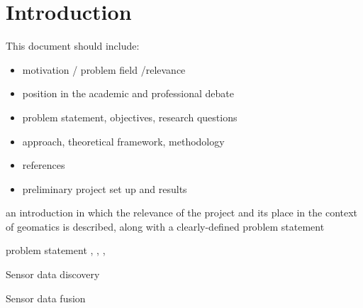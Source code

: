 
\chapter{Introduction}
\label{chap:introduction}

This document should include:

\begin{itemize} 
\item motivation / problem field /relevance

\item position in the academic and professional debate

\item problem statement, objectives, research questions

\item approach, theoretical framework, methodology

\item references

\item preliminary project set up and results

\end{itemize}


an introduction in which the relevance of the project and its place in the context of geomatics is described, along with a clearly-defined problem statement

problem statement \cite{SSW:Wang}, \cite{SSW:Corcho}, \cite{SSW:Ji}, \cite{SSW:Huang}

Sensor data discovery \cite{SSW:Llaves}

Sensor data fusion \cite{SSW:Perera}

